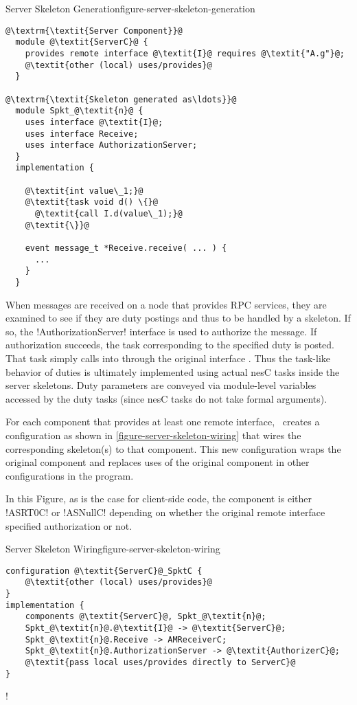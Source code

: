\begin{fpfig}[t]{Server Skeleton Generation}{figure-server-skeleton-generation}
{
\singlespace
\begin{lstlisting}[escapechar=@]
@\textrm{\textit{Server Component}}@
  module @\textit{ServerC}@ {
    provides remote interface @\textit{I}@ requires @\textit{"A.g"}@;
    @\textit{other (local) uses/provides}@
  }

@\textrm{\textit{Skeleton generated as\ldots}}@
  module Spkt_@\textit{n}@ {
    uses interface @\textit{I}@;
    uses interface Receive;
    uses interface AuthorizationServer;
  }
  implementation {

    @\textit{int value\_1;}@
    @\textit{task void d() \{}@
      @\textit{call I.d(value\_1);}@
    @\textit{\}}@

    event message_t *Receive.receive( ... ) {
      ...
    }
  }
\end{lstlisting}
\primaryspacing
}
\end{fpfig}

When messages are received on a node that provides RPC services, they are examined to see if
they are duty postings and thus to be handled by a skeleton. If so, the !AuthorizationServer!
interface is used to authorize the message. If authorization succeeds, the task corresponding to
the specified duty is posted. That task simply calls into  through the
original interface . Thus the task-like behavior of duties is ultimately
implemented using actual nesC tasks inside the server skeletons. Duty parameters are conveyed
via module-level variables accessed by the duty tasks (since nesC tasks do not take formal
arguments).

For each component that provides at least one remote interface, \Sprocket\ creates a
configuration as shown in \autoref{figure-server-skeleton-wiring} that wires the corresponding
skeleton(s) to that component. This new configuration wraps the original component and replaces
uses of the original component in other configurations in the program.

In this Figure, as is the case for client-side code, the  component
is either !ASRT0C! or !ASNullC! depending on whether the original remote interface specified
authorization or not.


\begin{fpfig}[t]{Server Skeleton Wiring}{figure-server-skeleton-wiring}
{
\singlespace
\begin{lstlisting}[escapechar=@]
configuration @\textit{ServerC}@_SpktC {
    @\textit{other (local) uses/provides}@
}
implementation {
    components @\textit{ServerC}@, Spkt_@\textit{n}@;
    Spkt_@\textit{n}@.@\textit{I}@ -> @\textit{ServerC}@;
    Spkt_@\textit{n}@.Receive -> AMReceiverC;
    Spkt_@\textit{n}@.AuthorizationServer -> @\textit{AuthorizerC}@;
    @\textit{pass local uses/provides directly to ServerC}@
}
\end{lstlisting}
\primaryspacing
}
\end{fpfig}

\lstDeleteShortInline!

